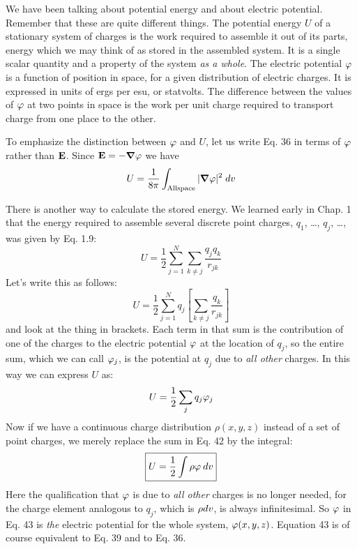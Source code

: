 We have been talking about potential energy and about electric
potential. Remember that these are quite different things. The potential
energy $U$ of a stationary system of charges is the work required
to assemble it out of its parts, energy which we may think of as stored
in the assembled system. It is a single scalar quantity and a property
of the system \emph{as a whole}. The electric potential $\varphi$ is a function of
position in space, for a given distribution of electric charges. It is
expressed in units of ergs per esu, or statvolts. The difference between
the values of $\varphi$ at two points in space is the work per unit
charge required to transport charge from one place to the other.

To emphasize the distinction between $\varphi$ and $U$, let us write Eq. 36
in terms of $\varphi$ rather than $\mathbf{E}$. Since $\mathbf{E} = -\boldsymbol{\nabla}\varphi$ we have
\begin{equation}
  U = \frac{1}{8\pi}\int_\text{All\\space} |\boldsymbol{\nabla}\varphi|^2\;d v
\end{equation}

There is another way to calculate the stored energy. We learned
early in Chap. 1 that the energy required to assemble several discrete
point charges, $q_1$, \ldots , $q_j$, \ldots , was given by Eq. 1.9:
\begin{equation}
  U = \frac{1}{2} \sum_{j=1}^N \sum_{k\ne j} \frac{q_jq_k}{r_{jk}}
\end{equation}
Let's write this as follows:
\begin{equation}
  U = \frac{1}{2} \sum_{j=1}^N q_j \left[\sum_{k\ne j} \frac{q_k}{r_{jk}}\right]
\end{equation}
and look at the thing in brackets. Each term in that sum is the contribution
of one of the charges to the electric potential $\varphi$ at the location
of $q_j$, so the entire sum, which we can call $\varphi_j$, is the potential at
$q_j$ due to \emph{all other} charges. In this way we can express $U$ as:
\begin{equation}
  U = \frac{1}{2}\sum_j q_j\varphi_j
\end{equation}
Now if we have a continuous charge distribution $\rho(x,y,z)$ instead of
a set of point charges, we merely replace the sum in Eq. 42 by the
integral:
\begin{equation}
\boxed{
  U = \frac{1}{2}\int \rho \varphi \:d v  
}
\end{equation}
Here the qualification that $\varphi$ is due to \emph{all other} charges is no longer
needed, for the charge element analogous to $q_j$, which is $\rho d v$, is
always infinitesimal. So $\varphi$ in Eq. 43 is \emph{the} electric potential for the
whole system, $\varphi(x,y,z)$. Equation 43 is of course equivalent to
Eq. 39 and to Eq. 36.

